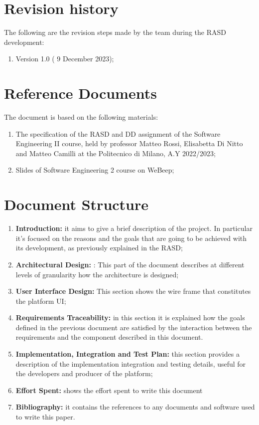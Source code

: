 \section{Revision history}
The following are the revision steps made by the team during the RASD development:
        \begin{enumerate}[label=\textbullet]
            \item Version 1.0 ( 9 December 2023);
            
        \end{enumerate}
        
\section{Reference Documents}
The document is based on the following materials:
    \begin{enumerate}[label=\textbullet]
        \item The specification of the RASD and DD assignment of the Software
              Engineering II course, held by professor Matteo Rossi, Elisabetta Di Nitto and Matteo Camilli at the Politecnico di Milano, A.Y 2022/2023;
        \item Slides of Software Engineering 2 course on WeBeep;
    \end{enumerate}

\section{Document Structure}
\begin{enumerate}[label=\arabic*., align=left]
        \item \textbf{Introduction: }it aims to give a brief description of the project. In particular it’s focused on the reasons and the goals that are going to be achieved with its development, as previously explained in the RASD;
        \item \textbf{Architectural Design: }: This part of the document describes at different levels of granularity how the architecture is designed;
        \item \textbf{User Interface Design: }
        This section shows the wire frame that constitutes the platform UI;
        \item \textbf{Requirements Traceability: }in this section it is explained how the goals defined in the previous document are satisfied by the interaction between the requirements and the component described in this document. 
        \item \textbf{Implementation, Integration and Test Plan: }this section provides a description of the implementation integration and testing details, useful for the developers and producer of the platform;
        \item \textbf{Effort Spent: }shows the effort spent to write this document
         \item \textbf{Bibliography: }it contains the references to any documents and software used to write this paper.
        
    \end{enumerate}


